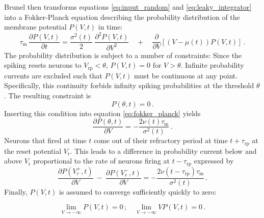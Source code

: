 Brunel then transforms equations \eqref{eq:input_random} and \eqref{eq:leaky_integrator}
into a Fokker-Planck equation describing the probability distribution of the membrane 
potential $P(V, t)$ in time: 
\begin{equation}
    \tau_\text{m} \, \frac{\partial P(V, t)}{\partial t} 
        = \frac{\sigma^2(t)}{2}  \: \frac{\partial^2 P(V, t)}{\partial V^2} 
         \quad + \quad \frac{\partial }{\partial V}  [(V- \mu(t)) P(V, t)] \, .
    \label{eq:fokker_planck}
\end{equation}
The probability distribution is subject to a number of 
constraints: Since the spiking resets neurons to $V_\text{rp} < \theta$, 
$P(V, t) = 0$ for $V > \theta$. Infinite probability currents are excluded 
such that $P(V, t)$ must be continuous at any point. Specifically, 
this continuity forbids infinity spiking probabilities at the threshold $\theta$. 
The resulting constraint is 
\begin{equation}
    P(\theta, t) = 0 \,.
    \label{eq:continuity} 
\end{equation}
Inserting this condition into equation \eqref{eq:fokker_planck} yields
\begin{equation}
    \frac{\partial P(\theta, t)}{\partial V}    
        = - \frac{2 \nu(t) \tau_\text{m}}{\sigma^2(t)}  \,.
\end{equation}
Neurons that fired at time $t$ come out of their refractory period at 
time $t + \tau_\text{rp}$ at the reset potential $V_\text{r}$. This leads to
a difference in probability current below and above $V_\text{r}$ proportional to 
the rate of neurons firing at $t - \tau_\text{rp}$ expressed by
\begin{equation}
    \frac{\partial P(V_r^+, t)}{\partial V} \: -  \: \frac{\partial P(V_r^-, t)}{\partial V} 
        = - \frac{2 \nu(t - \tau_\text{rp}) \tau_\text{m}}{\sigma^2(t)} \,.
\end{equation}
Finally, $P(V, t)$ is assumed to converge sufficiently quickly to zero:

\begin{equation}
\lim_{V \to -\infty} P(V, t) = 0 \, ;
    \quad 
    \lim_{V \to -\infty} V P(V, t) = 0 \,.
\end{equation}

